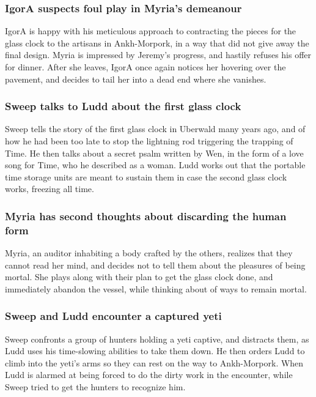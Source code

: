 \subsubsection{\Gls{IgorA} suspects foul play in \Gls{Myria}'s demeanour}
\Gls{IgorA} is happy with his meticulous approach to contracting the pieces for the glass clock to
the artisans in Ankh-Morpork, in a way that did not give away the final design. \Gls{Myria} is
impressed by \Gls{Jeremy}'s progress, and hastily refuses his offer for dinner. After she leaves,
\Gls{IgorA} once again notices her hovering over the pavement, and decides to tail her into a dead
end where she vanishes.

\subsubsection{\Gls{Sweep} talks to \Gls{Ludd} about the first glass clock}
\Gls{Sweep} tells the story of the first glass clock in Uberwald many years ago, and of how he had
been too late to stop the lightning rod triggering the trapping of \Gls{Time}. He then talks about a
secret psalm written by \Gls{Wen}, in the form of a love song for \Gls{Time}, who he described as a
woman. \Gls{Ludd} works out that the portable time storage units are meant to sustain them in case
the second glass clock works, freezing all time.

\subsubsection{\Gls{Myria} has second thoughts about discarding the human form}
\Gls{Myria}, an auditor inhabiting a body crafted by the others, realizes that they cannot read
her mind, and decides not to tell them about the pleasures of being mortal. She plays along with
their plan to get the glass clock done, and immediately abandon the vessel, while thinking about of
ways to remain mortal.

\subsubsection{\Gls{Sweep} and \Gls{Ludd} encounter a captured yeti}
\Gls{Sweep} confronts a group of hunters holding a yeti captive, and distracts them, as \Gls{Ludd}
uses his time-slowing abilities to take them down. He then orders \Gls{Ludd} to climb into the
yeti's arms so they can rest on the way to Ankh-Morpork. When \Gls{Ludd} is alarmed at being forced
to do the dirty work in the encounter, while \Gls{Sweep} tried to get the hunters to recognize him.

